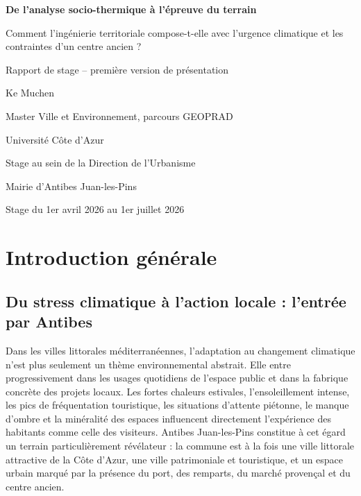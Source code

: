 \documentclass[11pt,a4paper]{report}
\begin{document}
\begin{titlepage}
  \centering
  \vspace*{3cm}
  {\Huge\bfseries\color{accent} De l'analyse socio-thermique à l'épreuve du terrain\par}
  \vspace{0.8cm}
  {\Large Comment l'ingénierie territoriale compose-t-elle avec l'urgence climatique et les contraintes d'un centre ancien ?\par}
  \vspace{2.2cm}
  {\large Rapport de stage -- première version de présentation\par}
  \vspace{1.5cm}
  {\large Ke Muchen\par}
  \vspace{0.4cm}
  {\large Master Ville et Environnement, parcours GEOPRAD\par}
  {\large Université Côte d'Azur\par}
  \vspace{1.2cm}
  {\large Stage au sein de la Direction de l'Urbanisme\par}
  {\large Mairie d'Antibes Juan-les-Pins\par}
  \vfill
  {\large Stage du 1er avril 2026 au 1er juillet 2026\par}
\end{titlepage}

\tableofcontents
\clearpage

\chapter*{Introduction générale}

\section*{Du stress climatique à l'action locale : l'entrée par Antibes}

Dans les villes littorales méditerranéennes, l'adaptation au changement climatique n'est plus seulement un thème environnemental abstrait. Elle entre progressivement dans les usages quotidiens de l'espace public et dans la fabrique concrète des projets locaux. Les fortes chaleurs estivales, l'ensoleillement intense, les pics de fréquentation touristique, les situations d'attente piétonne, le manque d'ombre et la minéralité des espaces influencent directement l'expérience des habitants comme celle des visiteurs. Antibes Juan-les-Pins constitue à cet égard un terrain particulièrement révélateur : la commune est à la fois une ville littorale attractive de la Côte d'Azur, une ville patrimoniale et touristique, et un espace urbain marqué par la présence du port, des remparts, du marché provençal et du centre ancien.
\end{document}
